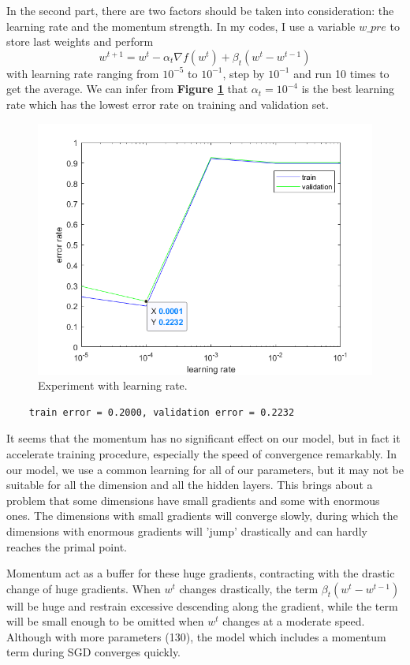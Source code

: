 \documentclass{article}
\begin{document}
In the second part, there are two factors should be taken into consideration: the learning rate and the momentum strength. In my codes, I use a variable $w\_pre$ to store last weights and perform
\[
w^{t+1}=w^t-\alpha_t\nabla f(w^t)+\beta_t(w^t-w^{t-1})
\]
with learning rate ranging from $10^{-5}$ to $10^{-1}$, step by $10^{-1}$ and run 10 times to get the average. We can infer from \textbf{Figure \ref{fig4}} that $\alpha_t=10^{-4}$ is the best learning rate which has the lowest error rate on training and validation set.

\begin{figure}[H]
	\centering
	\includegraphics[scale=0.5]{figure4}
	\caption{Experiment with learning rate.}
	\label{fig4}
\end{figure}

\begin{commandline}
	\begin{verbatim}
	train error = 0.2000, validation error = 0.2232
	\end{verbatim}
\end{commandline}

It seems that the momentum has no significant effect on our model, but in fact it accelerate training procedure, especially the speed of convergence remarkably. In our model, we use a common learning for all of our parameters, but it may not be suitable for all the dimension and all the hidden layers. This brings about a problem that some dimensions have small gradients and some with enormous ones. The dimensions with small gradients will converge slowly, during which the dimensions with enormous gradients will 'jump' drastically and can hardly reaches the primal point.\par
Momentum act as a buffer for these huge gradients, contracting with the drastic change of huge gradients. When $w^t$ changes drastically, the term $\beta_t(w^t-w^{t-1})$ will be huge and restrain excessive descending along the gradient, while the term will be small enough to be omitted when $w^t$ changes at a moderate speed. Although with more parameters (130), the model which includes a momentum term during SGD converges quickly.
\end{document}
